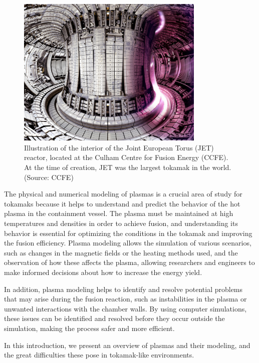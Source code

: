 \documentclass[12pt, a4paper]{article}
\begin{document}
    \begin{figure}[!ht]
        \centering
        \includegraphics[width = 0.8\textwidth]{images/JET.jpg}
        \caption{Illustration of the interior of the Joint European Torus (JET) reactor, located at the Culham Centre for Fusion Energy (CCFE). At the time of creation, JET was the largest tokamak in the world. (Source: CCFE)}
    \end{figure}

    \shortline

    The physical and numerical modeling of plasmas is a crucial area of study for tokamaks because it helps to understand and predict the behavior of the hot plasma in the containment vessel. The plasma must be maintained at high temperatures and densities in order to achieve fusion, and understanding its behavior is essential for optimizing the conditions in the tokamak and improving the fusion efficiency. Plasma modeling allows the simulation of various scenarios, such as changes in the magnetic fields or the heating methods used, and the observation of how these affects the plasma, allowing researchers and engineers to make informed decisions about how to increase the energy yield.
    
    In addition, plasma modeling helps to identify and resolve potential problems that may arise during the fusion reaction, such as instabilities in the plasma or unwanted interactions with the chamber walls. By using computer simulations, these issues can be identified and resolved before they occur outside the simulation, making the process safer and more efficient.
    
    \shortline

    In this introduction, we present an overview of plasmas and their modeling, and the great difficulties these pose in tokamak-like environments.
\end{document}
